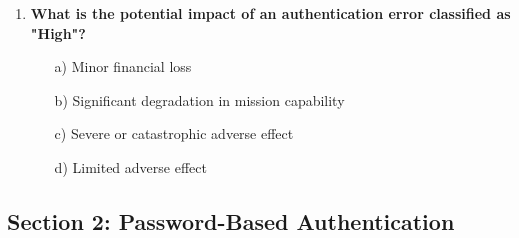 \documentclass{article}
\begin{document}
\begin{enumerate}
    \item \textbf{What is the potential impact of an authentication error classified as "High"?}
    \begin{itemize}
        \item[a)] Minor financial loss  
        \item[b)] Significant degradation in mission capability  
        \item[c)] Severe or catastrophic adverse effect  
        \item[d)] Limited adverse effect  
    \end{itemize}
\end{enumerate}

\subsection*{Section 2: Password-Based Authentication}
\end{document}
